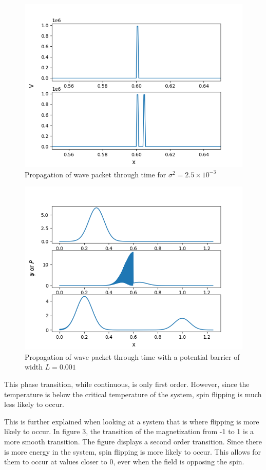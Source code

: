 \documentclass[pra,twocolumn,showpacs,amsmath,amssymb]{revtex4-2}
\begin{document}
\begin{figure}[t!]
\includegraphics[scale=0.5]{V_x.png}
\caption{Propagation of wave packet through time for $\sigma^2 = 2.5 \times 10^{-3}$}\label{Poincare0.5}
\end{figure}

\begin{figure}[t!]
\includegraphics[scale=0.50]{Barrier01.png}
\caption{Propagation of wave packet through time with a potential barrier of width $L = 0.001$}\label{Poincare9}
\end{figure}

\par This phase transition, while continuous, is only first order. However, since the temperature is below the critical temperature of the system, spin flipping is much less likely to occur.
\par This is further explained when looking at a system that is where flipping is more likely to occur. In figure 3, the transition of the magnetization from -1 to 1 is a more smooth transition. The figure displays a second order transition. Since there is more energy in the system, spin flipping is more likely to occur. This allows for them to occur at values closer to 0, ever when the field is opposing the spin.
\end{document}
